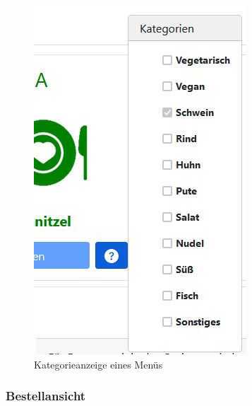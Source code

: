 \begin{figure}[htp]
    \centering
    \includegraphics[scale=0.5]{pics/kategorien_mitarbeiter.JPG}
    \caption{Kategorieanzeige eines Menüs}
    \label{fig:impl:CategoriesForMenue}
\end{figure}

\pagebreak

\subsubsection {Bestellansicht}


